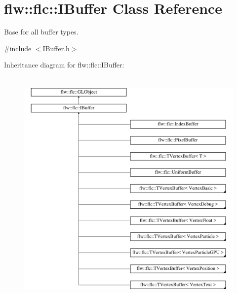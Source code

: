 \hypertarget{classflw_1_1flc_1_1IBuffer}{}\section{flw\+:\+:flc\+:\+:I\+Buffer Class Reference}
\label{classflw_1_1flc_1_1IBuffer}


Base for all buffer types.  




{\ttfamily \#include $<$I\+Buffer.\+h$>$}

Inheritance diagram for flw\+:\+:flc\+:\+:I\+Buffer\+:\begin{figure}[H]
\begin{center}
\leavevmode
\includegraphics[height=12.000000cm]{classflw_1_1flc_1_1IBuffer}
\end{center}
\end{figure}
